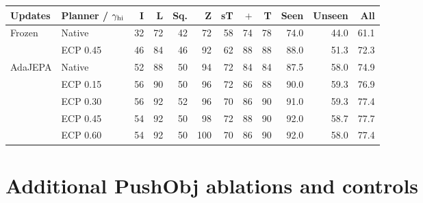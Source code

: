 \begin{table}[!t]
{\label{tab:threshold-shape}
\small
\begin{tabular*}{\textwidth}{@{\extracolsep{\fill}}ll*{10}{r}@{}}
\toprule
Updates & Planner / $\gamma_{\rm hi}$ & I & L & Sq. & Z & sT & $+$ & T & Seen & Unseen & All\\
\midrule
Frozen & Native & 32 & 72 & 42 & 72 & 58 & 74 & 78 & 74.0 & 44.0 & 61.1\\
 & ECP 0.45 & 46 & 84 & 46 & 92 & 62 & 88 & 88 & 88.0 & 51.3 & 72.3\\
\midrule
AdaJEPA & Native & 52 & 88 & 50 & 94 & 72 & 84 & 84 & 87.5 & 58.0 & 74.9\\
 & ECP 0.15 & 56 & 90 & 50 & 96 & 72 & 86 & 88 & 90.0 & 59.3 & 76.9\\
 & ECP 0.30 & 56 & 92 & 52 & 96 & 70 & 86 & 90 & 91.0 & 59.3 & 77.4\\
 & ECP 0.45 & 54 & 92 & 50 & 98 & 72 & 88 & 90 & 92.0 & 58.7 & 77.7\\
 & ECP 0.60 & 54 & 92 & 50 & 100 & 70 & 86 & 90 & 92.0 & 58.0 & 77.4\\
\bottomrule
\end{tabular*}
\par}
\par\smallskip
\noindent \begin{minipage}[t]{\columnwidth}
\vspace{0pt}
\section{Additional PushObj ablations and controls}
\label{sec:additional-controls}

\end{minipage}
\end{table}
